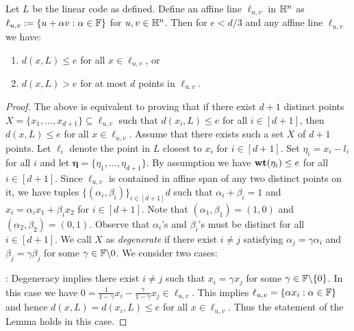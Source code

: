 \begin{lemma}\label{lem:affineline}
Let $L$ be the linear code as defined. Define an affine line $\ell_{u,v}$ in $\mathbb{H}^n$ as $\ell_{u,v} := \{u + \alpha v:\alpha\in \mathbb{F}\}$ for $u,v\in \mathbb{H}^n$. Then for $e < d/3$ and any affine line $\ell_{u,v}$ we have:
\begin{enumerate}[{\rm (i)}]
\item $d(x,L)\leq e$ for all $x\in \ell_{u,v}$, or
\item $d(x,L)> e$ for at most $d$ points in $\ell_{u,v}$.
\end{enumerate}
\end{lemma}
\begin{proof}
The above is equivalent to
proving that if there exist $d+1$ distinct points $X =
\{x_1,\ldots,x_{d+1}\}\subseteq \ell_{u,v}$ such
that $d(x_i,L)\leq e$ for all $i\in [d+1]$, then $d(x,L)\leq e$ for all $x\in
\ell_{u,v}$. Assume that there exists such a set $X$ of $d+1$ points. Let $\ell_i$ denote the point in $L$ closest to $x_i$ for $i\in
[d+1]$. Set $\eta_i=x_i-l_i$ for all $i$ and let
$\bm{\eta}=\{\eta_1,\ldots,\eta_{d+1}\}$. By assumption we have
$\mathbf{wt}({\eta_i})\leq e$ for all $i\in [d+1]$. Since $\ell_{u,v}$ is contained in affine
span of any two distinct points on it, we have tuples
$\{(\alpha_i,\beta_i)\}_{i\in [d+1]}d$ such that $\alpha_i + \beta_i=1$ and $x_i=\alpha_ix_1 +
\beta_ix_2$ for $i\in [d+1]$. Note that $(\alpha_1,\beta_1)=(1,0)$ and
$(\alpha_2,\beta_2)=(0,1)$. Observe that $\alpha_i$'s and $\beta_i$'s must be
distinct for all $i\in [d+1]$. We call $X$ as {\em degenerate} if there exist
$i\neq j$ satisfying $\alpha_j=\gamma\alpha_i$ and $\beta_j=\gamma\beta_j$ for
some $\gamma\in \mathbb{F}\backslash {0}$. We consider two cases:

: Degeneracy implies there exist $i\neq j$ such that $x_i=\gamma x_j$ for
some $\gamma\in \mathbb{F}\backslash\{0\}$. In this case we have $0 =
\frac{1}{1-\gamma}x_i -\frac{\gamma}{1-\gamma}x_j\in \ell_{u,v}$. This implies
$\ell_{u,v}=\{\alpha x_i: \alpha\in \mathbb{F}\}$
and hence $d(x,L)=d(x_i,L)\leq e$ for all $x\in \ell_{u,v}$. Thus the statement
of the Lemma holds in this case.\smallskip 


\end{proof}
